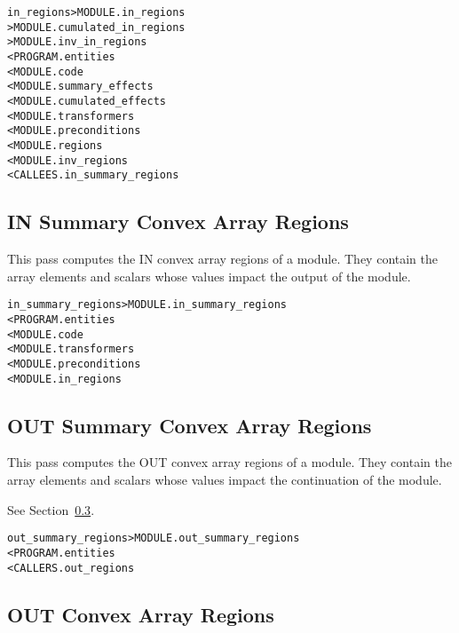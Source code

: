 \documentclass[a4paper]{report}
\newenvironment{PipsMake}{\begin{alltt}}{\end{alltt}}
\newenvironment{PipsPass}[1]{\label{pass:#1}}{}
\begin{document}
\begin{PipsMake}
in_regions                      > MODULE.in_regions
                                > MODULE.cumulated_in_regions
                                > MODULE.inv_in_regions
        < PROGRAM.entities
        < MODULE.code
        < MODULE.summary_effects
        < MODULE.cumulated_effects
        < MODULE.transformers
        < MODULE.preconditions
        < MODULE.regions
        < MODULE.inv_regions
        < CALLEES.in_summary_regions
\end{PipsMake}

\subsection{IN Summary Convex Array Regions}
\label{subsubsection-in-summary-regions}

This pass computes the IN convex array regions of a module. They
contain the array elements and scalars whose values impact the output
of the module.

\begin{PipsMake}
in_summary_regions              > MODULE.in_summary_regions
        < PROGRAM.entities
        < MODULE.code
        < MODULE.transformers
        < MODULE.preconditions
        < MODULE.in_regions
\end{PipsMake}


\subsection{OUT Summary Convex Array Regions}
\label{subsubsection-out-summary-regions}

\begin{PipsPass}{out_summary_regions}
This pass computes the OUT convex array regions of a module. They
contain the array elements and scalars whose values impact the
continuation of the module.
\end{PipsPass}


See Section~\ref{subsubsection-out-regions}.

\begin{PipsMake}
out_summary_regions             > MODULE.out_summary_regions
        < PROGRAM.entities
        < CALLERS.out_regions
\end{PipsMake}


\subsection{OUT Convex Array Regions}
\label{subsubsection-out-regions}
\end{document}
